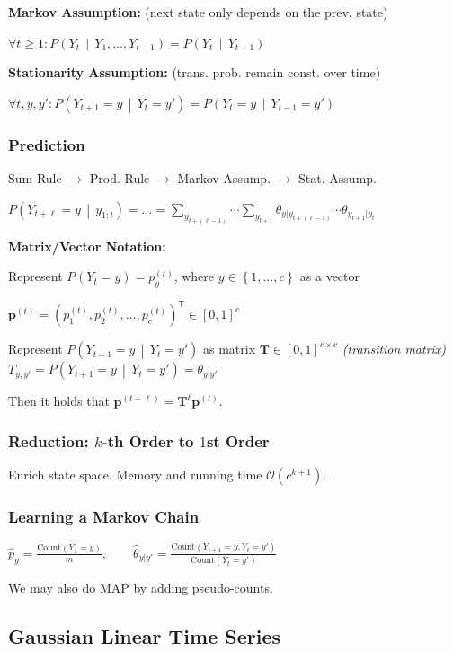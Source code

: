 \documentclass[a4paper,8pt,landscape]{extarticle}
\newcommand{\BigO}{\mathcal{O}}
\newcommand{\set}[1]{\left\{ #1 \right\}}
\newcommand{\Prob}[2][]{P_{#1}\left( #2 \right)}
\newcommand{\cProb}[2]{P\left( #1 \,\middle|\, #2 \right)}
\newcommand*{\T}{\mathsf{T}}
\newcommand{\mat}[1]{\mathbf{#1}}
\renewcommand{\vec}[1]{\mathbf{#1}}
\newcommand{\vp}{\vec{p}}
\newcommand{\MT}{\mat{T}}
\begin{document}
\begin{multicols*}{3}
\textbf{Markov Assumption:} (next state only depends on the prev. state)

$\forall t\geq 1\colon \cProb{Y_t}{Y_1,\ldots,Y_{t-1}}=\cProb{Y_t}{Y_{t-1}}$ 

\textbf{Stationarity Assumption:} (trans. prob. remain const.
over time)

$\forall t,y,y'\colon \cProb{Y_{t+1}=y}{Y_t=y'}=\cProb{Y_{t}=y}{Y_{t-1}=y'}$

\subsubsection{Prediction}

Sum Rule $\rightarrow$ Prod. Rule $\rightarrow$ Markov Assump.
$\rightarrow$ Stat. Assump.

$\cProb{Y_{t+\ell}=y}{y_{1:t}}= \ldots
=\sum_{y_{t+(\ell-1)}}\cdots\sum_{y_{t+1}} 
\theta_{y|y_{t+(\ell-1)}}\cdots
\theta_{y_{t+1}|y_{t}}
$

\textbf{Matrix/Vector Notation:}

Represent $\Prob{Y_t=y} = p_y^{(t)}$, where $y\in\set{1,\ldots,c}$ as a vector

$
\vp^{(t)} = (
p_1^{(t)},
p_2^{(t)},\ldots,
p_c^{(t)}
)^\T \in[0,1]^c
$

Represent $\cProb{Y_{t+1}=y}{Y_t=y'}$ as matrix $\MT\in[0,1]^{c\times c}$
\emph{(transition matrix)} $T_{y,y'} = \cProb{Y_{t+1}=y}{Y_t=y'} =
\theta_{y|y'}$

Then it holds that $
\vp^{(t+\ell)} = \MT^{\ell}\vp^{(t)}.
$

\subsubsection{Reduction: $k$-th Order to $1$st Order}

Enrich state space. Memory and running time $\BigO(c^{k+1})$.

\subsubsection{Learning a Markov Chain}

$
\hat{p}_y = \frac{\text{Count}(Y_1=y)}{m},\qquad
\hat{\theta}_{y|y'} =
\frac{\text{Count}(Y_{t+1}=y,Y_{t}=y')}{\text{Count}(Y_t=y')}
$

\Com We may also do MAP by adding pseudo-counts.

\subsection{Gaussian Linear Time Series}


\end{multicols*}
\end{document}
